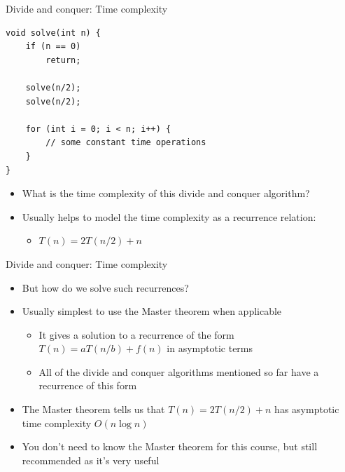 \documentclass{beamer}
\begin{document}
\begin{frame}{Divide and conquer: Time complexity}
    \begin{verbatim}
void solve(int n) {
    if (n == 0)
        return;

    solve(n/2);
    solve(n/2);

    for (int i = 0; i < n; i++) {
        // some constant time operations
    }
}
    \end{verbatim}

    \begin{itemize}
        \item What is the time complexity of this divide and conquer algorithm?
        \item Usually helps to model the time complexity as a recurrence relation:
            \begin{itemize}
                \item $T(n) = 2T(n/2) + n$
            \end{itemize}
    \end{itemize}
\end{frame}

\begin{frame}{Divide and conquer: Time complexity}
    \begin{itemize}
        \item But how do we solve such recurrences?
        \item Usually simplest to use the Master theorem when applicable
            \begin{itemize}
                \item It gives a solution to a recurrence of the form $T(n) = aT(n/b) + f(n)$ in asymptotic terms
                \item All of the divide and conquer algorithms mentioned so far have a recurrence of this form
            \end{itemize}
        \vspace{10pt}
        \item The Master theorem tells us that $T(n) = 2T(n/2) + n$ has asymptotic time complexity $O(n \log n)$
        \vspace{10pt}
        \item You don't need to know the Master theorem for this course, but still recommended as it's very useful
    \end{itemize}
\end{frame}
\end{document}
